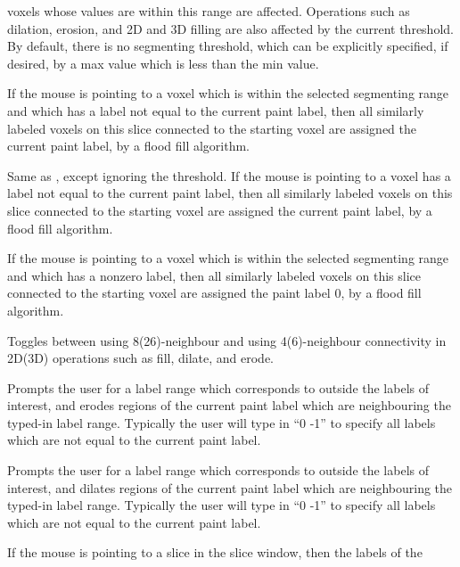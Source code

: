 \begin{description}
    voxels whose values are within this range are affected.  Operations
    such as dilation, erosion, and 2D and 3D filling are also affected by
    the current threshold.  By
    default, there is no segmenting threshold, which can be explicitly
    specified, if desired, by a max value which is less than the min value.
\item[\menutwo{Segmenting}{Label Fill}]  If the mouse is pointing
    to a voxel which is within the selected segmenting range and which
    has a label not equal to the current paint label, then all similarly
    labeled voxels on this slice connected
    to the starting voxel are assigned the current paint label, by a
    flood fill algorithm.
\item[\menutwo{Segmenting}{Label Fill No Thrs}]  Same as
    , except ignoring the threshold.
    If the mouse is pointing to a voxel has a label not equal to the
    current paint label, then all
    similarly labeled voxels on this slice connected
    to the starting voxel are assigned the current paint label, by a
    flood fill algorithm.
\item[\menutwo{Segmenting}{Clear Fill}]  If the mouse is pointing
    to a voxel which is within the selected segmenting range and which
    has a nonzero label, then all similarly labeled voxels on this slice
    connected to the starting voxel are assigned the paint label 0, by a
    flood fill algorithm.
\item[\menutwo{Segmenting}{Connectivity}]  Toggles between using
    8(26)-neighbour
    and using 4(6)-neighbour connectivity in 2D(3D) operations such as fill,
    dilate, and erode.
\item[\menutwo{Segmenting}{Erode 3D}]  Prompts the user for a label range
    which corresponds to outside the labels of interest, and erodes regions
    of the current paint label which are neighbouring the typed-in label
    range.  Typically the user will type in ``0 -1'' to specify all labels
    which are not equal to the current paint label.
\item[\menutwo{Segmenting}{Dilate 3D}]  Prompts the user for a label range
    which corresponds to outside the labels of interest, and dilates regions
    of the current paint label which are neighbouring the typed-in label
    range.  Typically the user will type in ``0 -1'' to specify all labels
    which are not equal to the current paint label.
\item[\menutwo{Segmenting}{Copy from Rt/Sup/Ant}]  If the mouse is
    pointing to a slice in the slice window, then the labels of the

\end{description}
